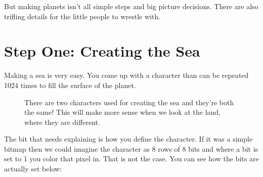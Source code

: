 But making planets isn't all simple steps and big picture decisions. There are also
trifling details for the little people to wrestle with.

\section{Step One: Creating the Sea}

Making a sea is very easy. You come up with a character than can be repeated 1024 times to fill the
surface of the planet.

\begin{figure}[H]
{
  \setlength{\tabcolsep}{3.0pt}
  \setlength\cmidrulewidth{\heavyrulewidth} %
    \begin{adjustbox}{width=10cm,center}
  \begin{subfigure}{0.3\textwidth}
  
  \end{subfigure}
  \begin{subfigure}{0.3\textwidth}
  
  \end{subfigure}
  \end{adjustbox}
}\caption[]{There are two characters used for creating the sea and they're both the same! This will make more sense when
we look at the land, where they are different.}
\end{figure}


The bit that needs explaining is how you define the character. If it was a simple bitmap then we could imagine the
character as 8 rows of 8 bits and where a bit is set to 1 you color that pixel in. That is not the case. You can
see how the bits are actually set below:

